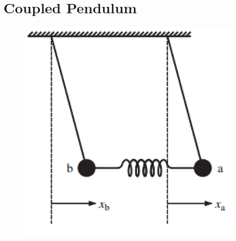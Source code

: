 \documentclass[letterpaper,12pt,english]{sphinxmanual}
\begin{document}
\section{Coupled Pendulum}
\label{picture:coupled-pendulum}\begin{figure}[htbp]
\centering

\includegraphics{coupledPendulum.png}
\end{figure}
\end{document}
